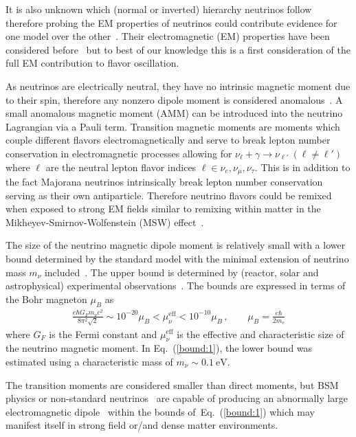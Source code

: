 \documentclass[addchapnum]{ws-rv961x669} %
\newcommand{\req}[1]{Eq.~(\ref{#1})}
\begin{document}
It is also unknown which (normal or inverted) hierarchy neutrinos follow therefore probing the EM properties of neutrinos could contribute evidence for one model over the other~\cite{Kouzakov:2023jtt}. Their electromagnetic (EM) properties have been considered before~\cite{Schechter:1981hw,Giunti:2014ixa,Chukhnova:2019oum,Popov:2019nkr} but to best of our knowledge this is a first consideration of the full EM contribution to flavor oscillation.

As neutrinos are electrically neutral, they have no intrinsic magnetic moment due to their spin, therefore any nonzero dipole moment is considered anomalous~\cite{Steinmetz:2018ryf}. A small anomalous magnetic moment (AMM) can be introduced into the neutrino Lagrangian via a Pauli term. Transition magnetic moments are moments which couple different flavors electromagnetically and serve to break lepton number conservation in electromagnetic processes allowing for $\nu_{\ell}+\gamma\rightarrow\nu_{\ell'}\ (\ell\neq\ell')$ where $\ell$ are the neutral lepton flavor indices $\ell\in\nu_{e},\nu_{\mu},\nu_{\tau}$. This is in addition to the fact Majorana neutrinos intrinsically break lepton number conservation serving as their own antiparticle. Therefore neutrino flavors could be remixed when exposed to strong EM fields similar to remixing within matter in the Mikheyev-Smirnov-Wolfenstein (MSW) effect~\citep{Wolfenstein:1977ue,Mikheyev:1985zog}.

The size of the neutrino magnetic dipole moment is relatively small with a lower bound determined by the standard model with the minimal extension of neutrino mass $m_{\nu}$ included~\cite{Fujikawa:1980yx,Shrock:1980vy,Shrock:1982sc}. The upper bound is determined by (reactor, solar and astrophysical) experimental observations~\cite{Giunti:2015gga,Canas:2015yoa,Studenikin:2016ykv,AristizabalSierra:2021fuc}. The bounds are expressed in terms of the Bohr magneton $\mu_{B}$ as
\begin{align}
    \label{bound:1}
    \frac{e\hbar G_{F}m_{\nu}c^{2}}{8\pi^{2}\sqrt{2}} \sim 10^{-20}\mu_{B}<\mu_{\nu}^\mathrm{eff}<10^{-10}\mu_{B}\,,\qquad\mu_{B}=\frac{e\hbar}{2m_{e}}
\end{align}
where $G_{F}$ is the Fermi constant and $\mu_{\nu}^\mathrm{eff}$ is the effective and characteristic size of the neutrino magnetic moment. In \req{bound:1}, the lower bound was estimated using a characteristic mass of $m_{\nu}\sim0.1~\mathrm{eV}$.

The transition moments are considered smaller than direct moments, but BSM physics or non-standard neutrinos~\cite{Giunti:2014ixa} are capable of producing an abnormally large electromagnetic dipole~\citep{Ohlsson:2012kf,Lindner:2017uvt,Brdar:2020quo} within the bounds of~\req{bound:1} which may manifest itself in strong field or/and dense matter environments.
\end{document}
